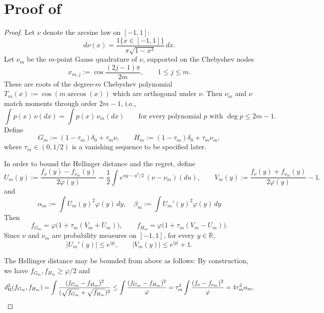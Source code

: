 \documentclass[letterpaper,11pt]{article}
\newcommand{\reals}{\mathbb{R}}
\newcommand{\hellinger}{d_{\rm H}}
\newcommand{\indc}[1]{{1\{{#1}\}}}
\theoremstyle{definition}
\begin{document}
    \section{Proof of }
\label{app:lb}
\begin{proof}
  Let $\nu$ denote the arcsine law on $[-1,1]$:
  \[
d\nu(x)=\frac{\indc{x \in [-1,1]}}{\pi \sqrt{1-x^2}}\,dx.
  \]
  Let $\nu_m$ be the $m$-point Gauss quadrature of $\nu$, supported on the Chebyshev nodes
  \[
    x_{m,j}:=\cos\frac{(2j-1)\pi}{2m},\qquad 1\le j\le m.
  \]
  These are roots of the degree-$m$ Chebyshev polynomial
      $T_m(x) := \cos(m\arccos(x))$
      which are orthogonal under $\nu$.
 Then $\nu_m$ and $\nu$ match moments through order $2m-1$, i.e.,
  \begin{equation}
    \int p(x)\,\nu(dx)=\int p(x)\,\nu_m(dx)
    \qquad
    \text{for every polynomial $p$ with $\deg p\le 2m-1$.}
    \label{eq:quad-exact}
  \end{equation}
  Define
  \[
    G_m:=(1-\tau_m)\delta_0+\tau_m \nu,
    \qquad
    H_m:=(1-\tau_m)\delta_0+\tau_m \nu_m,
  \]
  where $\tau_m\in(0,1/2)$ is a vanishing sequence to be specified later.


In order to bound the Hellinger distance and the regret, define
  \[
    U_m(y):=\frac{f_\nu(y)-f_{\nu_m}(y)}{2\varphi(y)}
    =
    \frac12\int e^{uy-u^2/2}\,(\nu-\nu_m)(du), \qquad
    V_m(y):=\frac{f_\nu(y)+f_{\nu_m}(y)}{2\varphi(y)}-1.
  \]
  and
  \[
  \alpha_m :=  \int U_m(y)^2\varphi(y)\,dy,
  \quad
   \beta_m:=\int U_m'(y)^2\varphi(y)\,dy
  \]
Then
  \[    f_{G_m}=\varphi\bigl(1+\tau_m(V_m+U_m)\bigr),
    \qquad
    f_{H_m}=\varphi\bigl(1+\tau_m(V_m-U_m)\bigr).
  \]
   Since $\nu$ and $\nu_m$ are probability measures on $[-1,1]$, for every $y\in\reals$,
  \begin{equation}
    |U_m'(y)|\le e^{|y|},
    \qquad
    |V_m(y)|\le e^{|y|}+1.
    \label{eq:UV-bounds}
  \end{equation}

  The Hellinger distance may be bounded from above as follows: By construction, we have $f_{G_m},f_{H_m}\ge \varphi/2$ and
  \begin{equation}
    \hellinger^2(f_{G_m},f_{H_m})
    =
    \int \frac{(f_{G_m}-f_{H_m})^2}{(\sqrt{f_{G_m}}+\sqrt{f_{H_m}})^2}
    \le
    \int \frac{(f_{G_m}-f_{H_m})^2}{\varphi}
    = \tau_m^2 \int \frac{(f_{\nu}-f_{\nu_m})^2}{\varphi}
    =
    4\tau_m^2 \alpha_m.
      \label{eq:H2-upper}
  \end{equation}


\end{proof}
\end{document}
